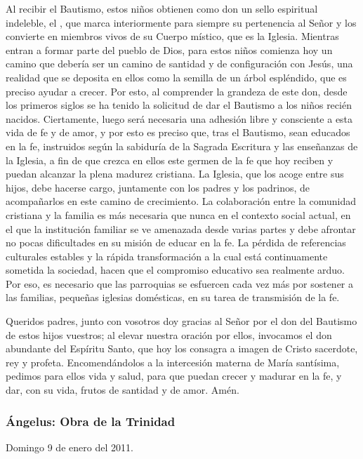 {Al recibir el Bautismo, estos niños obtienen como don un sello espiritual indeleble, el , que marca interiormente para siempre su pertenencia al Señor y los convierte en miembros vivos de su Cuerpo místico, que es la Iglesia. Mientras entran a formar parte del pueblo de Dios, para estos niños comienza hoy un camino que debería ser un camino de santidad y de configuración con Jesús, una realidad que se deposita en ellos como la semilla de un árbol espléndido, que es preciso ayudar a crecer. Por esto, al comprender la grandeza de este don, desde los primeros siglos se ha tenido la solicitud de dar el Bautismo a los niños recién nacidos. Ciertamente, luego será necesaria una adhesión libre y consciente a esta vida de fe y de amor, y por esto es preciso que, tras el Bautismo, sean educados en la fe, instruidos según la sabiduría de la Sagrada Escritura y las enseñanzas de la Iglesia, a fin de que crezca en ellos este germen de la fe que hoy reciben y puedan alcanzar la plena madurez cristiana. La Iglesia, que los acoge entre sus hijos, debe hacerse cargo, juntamente con los padres y los padrinos, de acompañarlos en este camino de crecimiento. La colaboración entre la comunidad cristiana y la familia es más necesaria que nunca en el contexto social actual, en el que la institución familiar se ve amenazada desde varias partes y debe afrontar no pocas dificultades en su misión de educar en la fe. La pérdida de referencias culturales estables y la rápida transformación a la cual está continuamente sometida la sociedad, hacen que el compromiso educativo sea realmente arduo. Por eso, es necesario que las parroquias se esfuercen cada vez más por sostener a las familias, pequeñas iglesias domésticas, en su tarea de transmisión de la fe.

Queridos padres, junto con vosotros doy gracias al Señor por el don del Bautismo de estos hijos vuestros; al elevar nuestra oración por ellos, invocamos el don abundante del Espíritu Santo, que hoy los consagra a imagen de Cristo sacerdote, rey y profeta. Encomendándolos a la intercesión materna de María santísima, pedimos para ellos vida y salud, para que puedan crecer y madurar en la fe, y dar, con su vida, frutos de santidad y de amor. Amén.

\subsubsection{Ángelus: Obra de la Trinidad}

Domingo 9 de enero del 2011.

}
